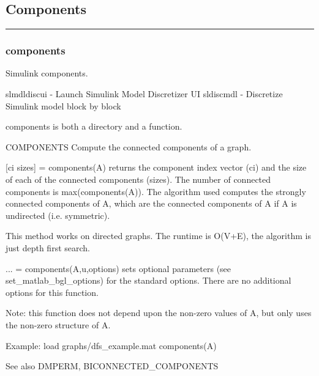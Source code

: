 \subsection*{Components}
\vspace{1cm}
\hrule
\subsubsection*{components}
\begin{mcode}
  Simulink components.
 
  slmdldiscui   - Launch Simulink Model Discretizer UI
  sldiscmdl     - Discretize Simulink model block by block 


components is both a directory and a function.

  COMPONENTS Compute the connected components of a graph.
 
  [ci sizes] = components(A) returns the component index vector (ci) and
  the size of each of the connected components (sizes).  The number of
  connected components is max(components(A)).  The algorithm used computes
  the strongly connected components of A, which are the connected
  components of A if A is undirected (i.e. symmetric).  
 
  This method works on directed graphs.
  The runtime is O(V+E), the algorithm is just depth first search.
 
  ... = components(A,u,options) sets optional parameters (see 
  set_matlab_bgl_options) for the standard options.
    There are no additional options for this function.
 
  Note: this function does not depend upon the non-zero values of A, but
  only uses the non-zero structure of A.
 
  Example: 
     load graphs/dfs_example.mat
     components(A)
 
  See also DMPERM, BICONNECTED_COMPONENTS
\end{mcode}
\newpage
